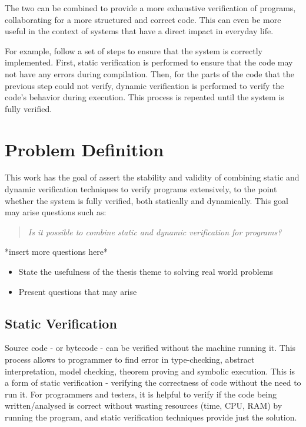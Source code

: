 The two can  be combined to provide a more exhaustive verification of \ocaml programs, 
collaborating for a more structured and correct code. This can even be more useful in the context of 
systems that have a direct impact in everyday life.

For example, \monitors follow a set of steps to ensure that the system is correctly implemented. 
First, static verification is performed to ensure that the code may not have any errors during compilation.
Then, for the parts of the code that the previous step could not verify, dynamic verification is performed 
to verify the code's behavior during execution. This process is repeated until the system is fully verified.

\section{Problem Definition}
\label{sec:problem_definition}

This work has the goal of assert the stability and validity of combining static and dynamic verification techniques 
to verify \ocaml programs extensively, to the point whether the system is fully verified, both statically and dynamically.
This goal may arise questions such as:

\begin{quote}
    \emph{Is it possible to combine static and dynamic verification for \ocaml programs?}
\end{quote}

*insert more questions here*


\begin{itemize}
    \item State the usefulness of the thesis theme to solving real world problems
    \item Present questions that may arise
\end{itemize}

\subsection{Static Verification}
\label{sub:static_verification}

Source code - or bytecode - can be verified without the machine running it. This process allows to programmer 
to find error in type-checking, abstract interpretation, model checking, theorem proving and symbolic execution.
This is a form of static verification - verifying the correctness of code without the need to run it.
For programmers and testers, it is helpful to verify if the code being written/analysed is correct without 
wasting resources (time, CPU, RAM) by running the program, and static verification techniques provide just the solution.

